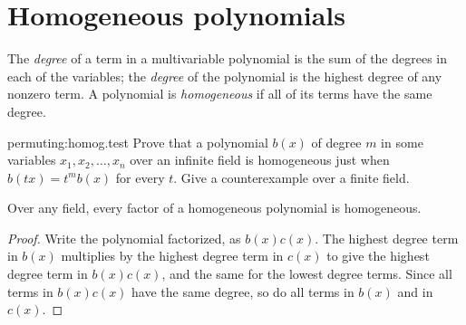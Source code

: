 \section{Homogeneous polynomials}
The \emph{degree} of a term in a multivariable polynomial is the sum of the degrees in each of the variables; the \emph{degree} of the polynomial is the highest degree of any nonzero term.
A polynomial is \emph{homogeneous} if all of its terms have the same degree.
\begin{problem}{permuting:homog.test}
Prove that a polynomial \(b(x)\) of degree \(m\) in some variables \(x_1,x_2,\dots,x_n\) over an infinite field is homogeneous just when \(b(tx)=t^mb(x)\) for every \(t\).
Give a counterexample over a finite field.
\end{problem}
\begin{lemma}
Over any field, every factor of a homogeneous polynomial is homogeneous.
\end{lemma}
\begin{proof}
Write the polynomial factorized, as
\(
b(x)c(x)
\).
The highest degree term in \(b(x)\) multiplies by the highest degree term in \(c(x)\) to give the highest degree term in \(b(x)c(x)\), and the same for the lowest degree terms.
Since all terms in \(b(x)c(x)\) have the same degree, so do all terms in \(b(x)\) and in \(c(x)\).
\end{proof}

